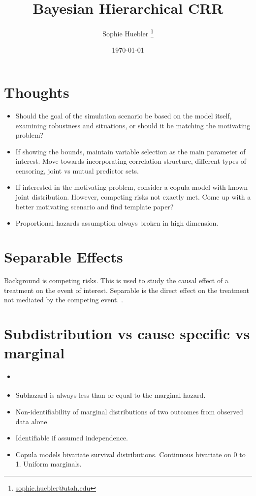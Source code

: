 \documentclass[11pt,a4paper]{article}
\let\cite\parencite
\begin{document}
%
\title{Bayesian Hierarchical CRR}
\author{Sophie Huebler \thanks{\href{mailto:sophie.huebler@utah.edu}{sophie.huebler@utah.edu}}}
\date{\today}
\maketitle
{} 
\tableofcontents

\newpage
\section{Thoughts}
\begin{itemize}
    \item Should the goal of the simulation scenario be based on the model itself, examining robustness and situations, or should it be matching the motivating problem?
    \item If showing the bounds, maintain variable selection as the main parameter of interest. Move towards incorporating correlation structure, different types of censoring, joint vs mutual predictor sets.
    \item If interested in the motivating problem, consider a copula model with known joint distribution. However, competing risks not exactly met. Come up with a better motivating scenario and find template paper?
    \item Proportional hazards assumption always broken in high dimension. 
\end{itemize}

\section{Separable Effects}
Background is competing risks. This is used to study the causal effect of a treatment on the event of interest. Separable is the direct effect on the treatment not mediated by the competing event.  \cite{Stensrud2019}.

\section{Subdistribution vs cause specific vs marginal}
\begin{itemize}
    \item \cite{Emura2020}
    \item Subhazard is always less than or equal to the marginal hazard.
    \item Non-identifiability of marginal distributions of two outcomes from observed data alone \cite{Tsiatis1975}
    \item Identifiable if assumed independence.
    \item Copula models bivariate survival distributions. Continuous bivariate on 0 to 1. Uniform marginals. 
\end{itemize}
\end{document}

